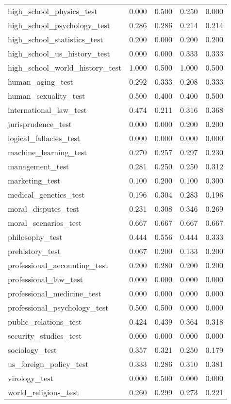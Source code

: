 \begin{tabular}{lrrrr}
high\_school\_physics\_test & 0.000 & 0.500 & 0.250 & 0.000 \\
high\_school\_psychology\_test & 0.286 & 0.286 & 0.214 & 0.214 \\
high\_school\_statistics\_test & 0.200 & 0.000 & 0.200 & 0.200 \\
high\_school\_us\_history\_test & 0.000 & 0.000 & 0.333 & 0.333 \\
high\_school\_world\_history\_test & 1.000 & 0.500 & 1.000 & 0.500 \\
human\_aging\_test & 0.292 & 0.333 & 0.208 & 0.333 \\
human\_sexuality\_test & 0.500 & 0.400 & 0.400 & 0.500 \\
international\_law\_test & 0.474 & 0.211 & 0.316 & 0.368 \\
jurisprudence\_test & 0.000 & 0.000 & 0.200 & 0.200 \\
logical\_fallacies\_test & 0.000 & 0.000 & 0.000 & 0.000 \\
machine\_learning\_test & 0.270 & 0.257 & 0.297 & 0.230 \\
management\_test & 0.281 & 0.250 & 0.250 & 0.312 \\
marketing\_test & 0.100 & 0.200 & 0.100 & 0.300 \\
medical\_genetics\_test & 0.196 & 0.304 & 0.283 & 0.196 \\
moral\_disputes\_test & 0.231 & 0.308 & 0.346 & 0.269 \\
moral\_scenarios\_test & 0.667 & 0.667 & 0.667 & 0.667 \\
philosophy\_test & 0.444 & 0.556 & 0.444 & 0.333 \\
prehistory\_test & 0.067 & 0.200 & 0.133 & 0.200 \\
professional\_accounting\_test & 0.200 & 0.280 & 0.200 & 0.200 \\
professional\_law\_test & 0.000 & 0.000 & 0.000 & 0.000 \\
professional\_medicine\_test & 0.000 & 0.000 & 0.000 & 0.000 \\
professional\_psychology\_test & 0.500 & 0.500 & 0.000 & 0.000 \\
public\_relations\_test & 0.424 & 0.439 & 0.364 & 0.318 \\
security\_studies\_test & 0.000 & 0.000 & 0.000 & 0.000 \\
sociology\_test & 0.357 & 0.321 & 0.250 & 0.179 \\
us\_foreign\_policy\_test & 0.333 & 0.286 & 0.310 & 0.381 \\
virology\_test & 0.000 & 0.500 & 0.000 & 0.000 \\
world\_religions\_test & 0.260 & 0.299 & 0.273 & 0.221 \\
\bottomrule
\end{tabular}
